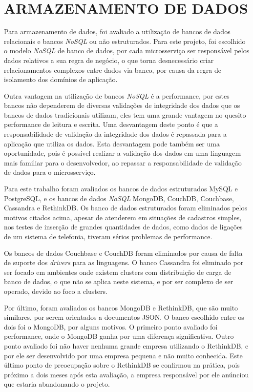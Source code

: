 {\section{ARMAZENAMENTO DE DADOS}

Para armazenamento de dados, foi avaliado a utilização de bancos de dados
relacionais e bancos \emph{NoSQL} ou não estruturados. Para este projeto, foi
escolhido o modelo \emph{NoSQL} de banco de dados, por cada microsserviço
ser responsável pelos dados relativos a sua regra de negócio, o que torna
desnecessário criar relacionamentos complexos entre dados via banco,
por causa da regra de isolamento dos domínios de aplicação.

Outra vantagem na utilização de bancos \emph{NoSQL} é a performance, por
estes bancos não dependerem de diversas validações de integridade dos dados
que os bancos de dados tradicionais utilizam, eles tem uma grande vantagem
no quesito performance de leitura e escrita. Uma desvantagem deste ponto é
que a responsabilidade de validação da integridade dos dados é repassada para
a aplicação que utiliza os dados. Esta desvantagem pode também ser uma
oportunidade, pois é possível realizar a validação dos dados em uma
linguagem mais familiar para o desenvolvedor, ao repassar a responsabilidade
de validação de dados para o microsserviço.

Para este trabalho foram avaliados os bancos de dados estruturados MySQL e
PostgreSQL, e os bancos de dados \emph{NoSQL} MongoDB, CouchDB, Couchbase,
Cassandra e RethinkDB. Os banco de dados estruturados foram eliminados
pelos motivos citados acima, apesar de atenderem em situações de cadastros
simples, nos testes de inserção de grandes quantidades de dados, como
dados de ligações de um sistema de telefonia, tiveram sérios problemas de
performance.

Os bancos de dados Couchbase e CouchDB foram eliminados por causa de falta
de suporte dos \emph{drivers} para as linguagens. O banco Cassandra foi
eliminado por ser focado em ambientes onde existem clusters com distribuição
de carga de banco de dados, o que não se aplica neste sistema, e por
ser complexo de ser operado, devido ao foco a clusters.

Por último, foram avaliados os bancos MongoDB e RethinkDB, que são muito
similares, por serem orientados a documentos \ac{JSON}. O banco escolhido
entre os dois foi o MongoDB, por alguns motivos. O primeiro ponto avaliado
foi performance, onde o MongoDB ganha por uma diferença significativa. Outro
ponto avaliado foi não haver nenhuma grande empresa utilizando o RethinkDB, e
por ele ser desenvolvido por uma empresa pequena e não muito conhecida.
Este último ponto de preocupação sobre o RethinkDB se confirmou na prática,
pois próximo a dois meses após esta avaliação, a empresa responsável por ele
anúnciou que estaria abandonando o projeto.

}
